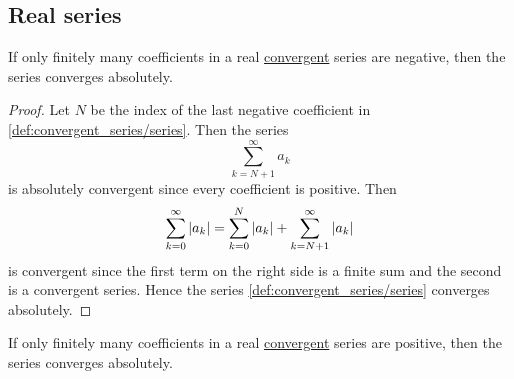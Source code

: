 \subsection{Real series}\label{subsec:real_series}

\begin{proposition}\label{thm:almost_all_terms_positive_implies_absolute_convergent}
  If only finitely many coefficients in a real \hyperref[def:convergent_series]{convergent} series are negative, then the series converges absolutely.
\end{proposition}
\begin{proof}
  Let \( N \) be the index of the last negative coefficient in \eqref{def:convergent_series/series}. Then the series
  \begin{equation*}
    \sum_{k={N+1}}^\infty a_k
  \end{equation*}
  is absolutely convergent since every coefficient is positive. Then
  \begin{equation*}
    \sum_{k=0}^\infty \left\vert a_k \right\vert = \sum_{k=0}^N \left\vert a_k \right\vert + \sum_{k=N+1}^\infty \left\vert a_k \right\vert
  \end{equation*}
  is convergent since the first term on the right side is a finite sum and the second is a convergent series. Hence the series \eqref{def:convergent_series/series} converges absolutely.
\end{proof}

\begin{corollary}\label{thm:almost_all_terms_negative_implies_absolute_convergent}
  If only finitely many coefficients in a real \hyperref[def:convergent_series]{convergent} series are positive, then the series converges absolutely.
\end{corollary}

